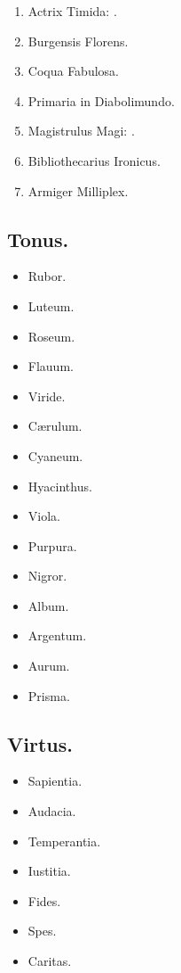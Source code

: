 \documentclass[12pt]{book}
\begin{document}
\begin{enumerate}
  \item Actrix Timida: .
  \item Burgensis Florens.
  \item Coqua Fabulosa.
  \item Primaria in Diabolimundo.

  \setcounter{enumi}{495}
  \item Magistrulus Magi: .
  \setcounter{enumi}{1000}
  \item Bibliothecarius Ironicus.
  \setcounter{enumi}{1000}
  \item Armiger Milliplex.
\end{enumerate}

\subsection{Tonus.}\label{tonus}

\begin{itemize}
  \item Rubor.
  \item Luteum.
  \item Roseum.
  \item Flauum.
  \item Viride.
  \item Cærulum.
  \item Cyaneum.
  \item Hyacinthus.
  \item Viola.
  \item Purpura.
  \item Nigror.
  \item Album.
  \item Argentum.
  \item Aurum.
  \item Prisma.
\end{itemize}

\subsection{Virtus.}\label{virtus}

\begin{itemize}
  \item Sapientia.
  \item Audacia.
  \item Temperantia.
  \item Iustitia.
  \item Fides.
  \item Spes.
  \item Caritas.
\end{itemize}
\end{document}
